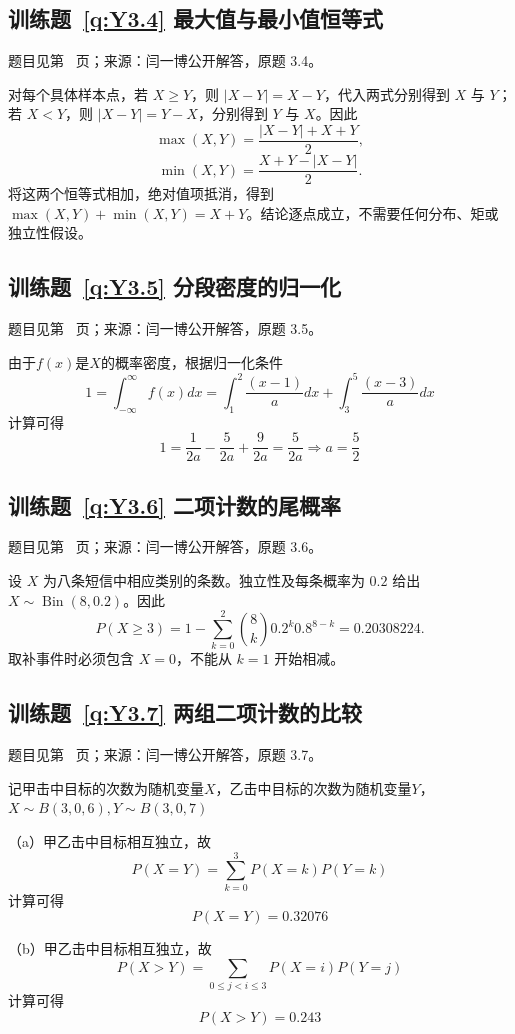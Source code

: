\subsection*{训练题~\ref{q:Y3.4} 最大值与最小值恒等式}\label{a:Y3.4}{\small 题目见第~\pageref{q:Y3.4} 页；来源：闫一博公开解答，原题 3.4。}
\begin{solve}对每个具体样本点，若 $X\ge Y$，则 $|X-Y|=X-Y$，代入两式分别得到 $X$ 与 $Y$；若 $X<Y$，则 $|X-Y|=Y-X$，分别得到 $Y$ 与 $X$。因此\[\max(X,Y)=\frac{|X-Y|+X+Y}{2},\]\[\min(X,Y)=\frac{X+Y-|X-Y|}{2}.\]将这两个恒等式相加，绝对值项抵消，得到 $\max(X,Y)+\min(X,Y)=X+Y$。结论逐点成立，不需要任何分布、矩或独立性假设。\end{solve}

\subsection*{训练题~\ref{q:Y3.5} 分段密度的归一化}\label{a:Y3.5}{\small 题目见第~\pageref{q:Y3.5} 页；来源：闫一博公开解答，原题 3.5。}
\begin{solve}
由于$f(x)$是$X$的概率密度，根据归一化条件
\[1 = \int_{ - \infty }^\infty  {f(x)dx}  = \int_1^2 {\frac{{(x - 1)}}{a}dx}  + \int_3^5 {\frac{{(x - 3)}}{a}dx} \]
计算可得
\[1 = \frac{1}{{2a}} - \frac{5}{{2a}} + \frac{9}{{2a}} = \frac{5}{{2a}} \Rightarrow a = \frac{5}{2}\]
\end{solve}

\subsection*{训练题~\ref{q:Y3.6} 二项计数的尾概率}\label{a:Y3.6}{\small 题目见第~\pageref{q:Y3.6} 页；来源：闫一博公开解答，原题 3.6。}
\begin{solve}设 $X$ 为八条短信中相应类别的条数。独立性及每条概率为 $0.2$ 给出 $X\sim\operatorname{Bin}(8,0.2)$。因此\[P(X\ge3)=1-\sum_{k=0}^{2}\binom8k0.2^k0.8^{8-k}=0.20308224.\]取补事件时必须包含 $X=0$，不能从 $k=1$ 开始相减。\end{solve}

\subsection*{训练题~\ref{q:Y3.7} 两组二项计数的比较}\label{a:Y3.7}{\small 题目见第~\pageref{q:Y3.7} 页；来源：闫一博公开解答，原题 3.7。}
\begin{solve}
记甲击中目标的次数为随机变量$X$，乙击中目标的次数为随机变量$Y$，$X\sim B(3,0,6),Y\sim B(3,0,7)$

（a）甲乙击中目标相互独立，故
\[P(X = Y) = \sum\limits_{k = 0}^3 {P(X = k)P(Y = k)} \]
计算可得
\[P(X = Y) = 0.32076\]

（b）甲乙击中目标相互独立，故
\[P(X > Y) = \sum\limits_{0 \leqslant j < i \leqslant 3} {P(X = i)P(Y = j)} \]
计算可得
\[P(X > Y) = 0.243\]
\end{solve}

